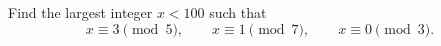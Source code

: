 Find the largest integer $x<100$ such that
\[
x\equiv3\pmod5,\qquad x\equiv1\pmod7,\qquad x\equiv0\pmod3 .
\]
